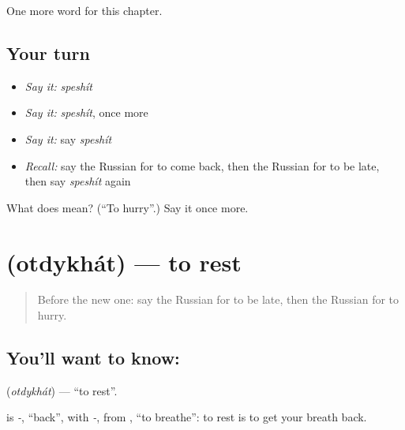 \begin{grammarlens}[title={What you've built}]
One more word for this chapter.
\end{grammarlens}

\subsection*{Your turn}
\begin{itemize}
\raggedright
  \item \emph{Say it:} \emph{speshít}
  \item \emph{Say it:} \emph{speshít}, once more
  \item \emph{Say it:} say \emph{speshít}
  \item \emph{Recall:} say the Russian for to come back, then the Russian for to be late, then say \emph{speshít} again
\end{itemize}

\begin{tcolorbox}[breakable,colback=teal!4,colframe=teal!35!black,title={Before you move on}]
What does  mean? (\textquotedblleft{}To hurry\textquotedblright{}.) Say it once more.
\end{tcolorbox}
\section[\texorpdfstring{\ru{отдыхать} (otdykhát)}{отдыхать (otdykhát)}]{ (otdykhát) — to rest}

\label{lesson:RU-C176-otdykhat}



\begin{quote}
Before the new one: say the Russian for to be late, then the Russian for to hurry.
\end{quote}

\subsection*{You'll want to know: }
\textbf{} (\emph{otdykhát}) — \textquotedblleft{}to rest\textquotedblright{}.

\begin{cousinweb}
\textbf{} is \emph{-}, \textquotedblleft{}back\textquotedblright{}, with \emph{-}, from \emph{}, \textquotedblleft{}to breathe\textquotedblright{}: to rest is to get your breath back.
\end{cousinweb}

